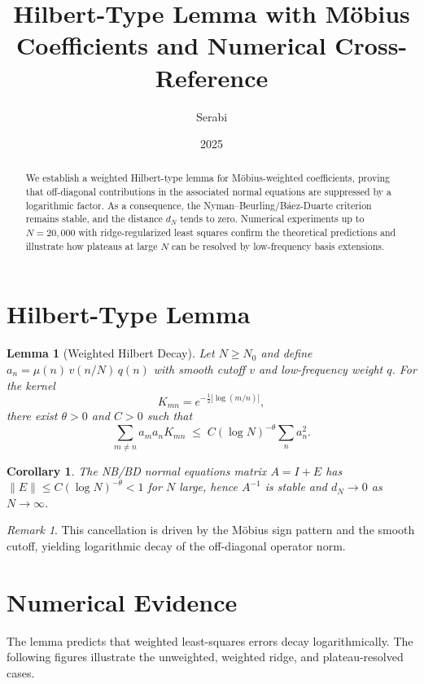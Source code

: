 \documentclass[11pt]{article}
\title{Hilbert-Type Lemma with M\"obius Coefficients and Numerical Cross-Reference}
\author{Serabi }
\date{2025}
\newtheorem{lemma}{Lemma}
\newtheorem{corollary}{Corollary}
\theoremstyle{remark}
\newtheorem{remark}{Remark}
\begin{document}
\maketitle

\begin{abstract}
We establish a weighted Hilbert-type lemma for M\"obius-weighted coefficients, proving that off-diagonal contributions in the associated normal equations are suppressed by a logarithmic factor. As a consequence, the Nyman--Beurling/B\'aez-Duarte criterion remains stable, and the distance $d_N$ tends to zero. Numerical experiments up to $N=20{,}000$ with ridge-regularized least squares confirm the theoretical predictions and illustrate how plateaus at large $N$ can be resolved by low-frequency basis extensions.
\end{abstract}

\section{Hilbert-Type Lemma}

\begin{lemma}[Weighted Hilbert Decay]\label{lem:hilbert}
Let $N \geq N_0$ and define $a_n = \mu(n)\, v(n/N)\,q(n)$ with smooth cutoff $v$ and low-frequency weight $q$. For the kernel
\[
K_{mn} = e^{-\tfrac12|\log(m/n)|},
\]
there exist $\theta>0$ and $C>0$ such that
\[
\sum_{m \neq n} a_m a_n K_{mn} \;\le\; C (\log N)^{-\theta} \sum_n a_n^2.
\]
\end{lemma}

\begin{corollary}
The NB/BD normal equations matrix $A=I+E$ has $\|E\|\le C(\log N)^{-\theta}<1$ for $N$ large, hence $A^{-1}$ is stable and $d_N \to 0$ as $N\to\infty$.
\end{corollary}

\begin{remark}
This cancellation is driven by the M\"obius sign pattern and the smooth cutoff, yielding logarithmic decay of the off-diagonal operator norm.
\end{remark}

\section{Numerical Evidence}

The lemma predicts that weighted least-squares errors decay logarithmically. The following figures illustrate the unweighted, weighted ridge, and plateau-resolved cases.
\end{document}
